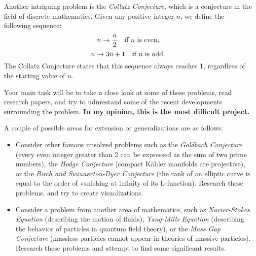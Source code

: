 \documentclass{article}
\begin{document}
    \vspace{3mm}
    Another intriguing problem is the \textit{Collatz Conjecture}, which is a conjecture in the field of discrete mathematics. Given any positive integer $n$, we define the following sequence: $$n \rightarrow \frac{n}{2} \text{\quad if $n$ is even},$$ $$n \rightarrow 3n + 1 \text{\quad if $n$ is odd}.$$ The Collatz Conjecture states that this sequence always reaches 1, regardless of the starting value of $n$.
    
    \vspace{3mm}
    Your main task will be to take a close look at some of these problems, read research papers, and try to udnrestand some of the recent developments surrounding the problem. \textbf{In my opinion, this is the most difficult project.}
    
    \vspace{3mm}
    A couple of possible areas for extension or generalizations are as follows:
    \begin{itemize}
        \item Consider other famous unsolved problems such as the \textit{Goldbach Conjecture} (every even integer greater than 2 can be expressed as the sum of two prime numbers), the \textit{Hodge Conjecture} (compact K\"ahler manifolds are projective), or the \textit{Birch and Swinnerton-Dyer Conjecture} (the rank of an elliptic curve is equal to the order of vanishing at infinity of its L-function). Research these problems, and try to create visualizations.
        \item Consider a problem from another area of mathematics, such as \textit{Navier-Stokes Equation} (describing the motion of fluids), \textit{Yang-Mills Equation} (describing the behavior of particles in quantum field theory), or the \textit{Mass Gap Conjecture} (massless particles cannot appear in theories of massive particles). Research these problems and attempt to find some significant results.
    \end{itemize}
\end{document}
